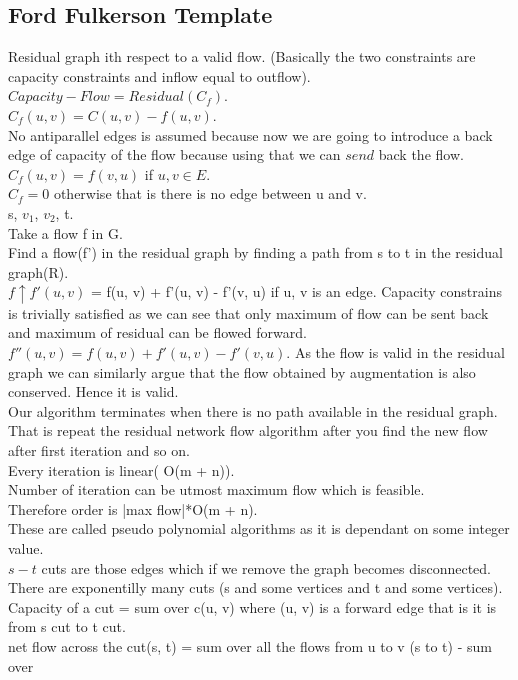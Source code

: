 \documentclass[solution,addpoints,12pt]{exam}
\begin{document}
\subsection{Ford Fulkerson Template}
Residual graph ith respect to a valid flow. (Basically the two constraints are capacity constraints
and inflow equal to outflow). $Capacity - Flow = Residual(C_f)$.\\
$C_f(u, v) = C(u, v) - f(u, v)$.\\
No antiparallel edges is assumed because now we are going to introduce a back edge of capacity
of the flow because using that we can $send$ back the flow.\\
$C_f(u, v) = f(v, u)$ if $u, v \in E$.\\
$C_f = 0$ otherwise that is there is no edge between u and v.\\
s, $v_1$, $v_2$, t.\\
Take a flow f in G.\\
Find a flow(f') in the residual graph by finding a path from s to t in the residual graph(R).\\
$f \uparrow f'(u,v)$ = f(u, v) + f'(u, v) - f'(v, u) if u, v is an edge.
Capacity constrains is trivially satisfied as we can see that only maximum of
flow can be sent back and maximum of residual can be flowed forward.
$f''(u, v) = f(u, v) + f'(u, v) - f'(v, u)$. As the flow is valid in the
residual graph we can similarly argue that the flow obtained by augmentation
is also conserved. Hence it is valid.\\
Our algorithm terminates when there is no path available in the residual graph.
That is repeat the residual network flow algorithm after you find the new flow
after first iteration and so on.\\
Every iteration is linear( O(m + n)).\\
Number of iteration can be utmost maximum flow which is feasible.\\
Therefore order is |max flow|*O(m + n).\\
These are called pseudo polynomial algorithms as it is dependant on some integer value.\\
$s-t$ cuts are those edges which if we remove the graph becomes disconnected.\\
There are exponentilly many cuts (s and some vertices and t and some vertices).\\
Capacity of a cut = sum over c(u, v) where (u, v) is a forward edge that is it
is from s cut to t cut.\\
net flow across the cut(s, t) = sum over all the flows from u to v (s to t) - sum over
\end{document}
